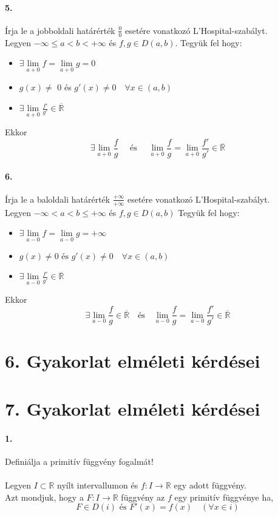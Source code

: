 \documentclass[10pt,a4paper]{article}
\newcommand{\R}{\mathbb{R}}
\newcommand{\pf}{+\infty}
\newcommand{\nf}{-\infty}
\renewcommand{\>}{\rightarrow}
\begin{document}
\paragraph{5.}
Írja le a jobboldali határérték $\frac{0}{0}$ esetére vonatkozó L'Hospital-szabályt. \\
Legyen $\nf \leq a < b < \pf $ és $f,g\in D(a,b).$ Tegyük fel hogy:
\begin{itemize}
\item $\exists \lim\limits_{a+0}f=\lim\limits_{a+0}g=0 $
\item $g(x)\neq$ 0 és $g'(x)\neq 0 \quad \forall x \in (a,b)$
\item $\exists \lim\limits_{a+0} \frac{f'}{g'} \in \overline{\R}$
\end{itemize}
Ekkor
\[
\exists 	\lim\limits_{a+0} \frac{f}{g} \quad \text{ és } \quad \lim\limits_{a+0}\frac{f}{g} = \lim\limits_{a+0}\frac{f'}{g'} \in \overline{\R}
\]
\paragraph{6.}
Írja le a baloldali határérték $\frac{\pf}{\pf}$ esetére vonatkozó L'Hospital-szabályt. \\
Legyen $\nf < a<b\leq \pf$ és $f,g\in D(a,b)$ Tegyük fel hogy:
\begin{itemize}
\item $\exists \lim\limits_{a-0}f=\lim\limits_{a-0} g = \pf$
\item $g(x)\neq 0 \text{ és } g'(x)\neq 0 \quad \forall x \in(a,b)$
\item $\exists \lim\limits_{a-0} \frac{f'}{g'} \in \overline{\R}$
\end{itemize}
Ekkor
\[
\exists \lim\limits_{a-0}\frac{f}{g} \in \overline{\R} \quad \text{és} \quad \lim\limits_{a-0}\frac{f}{g} = \lim\limits_{a-0} \frac{f'}{g'} \in \overline{\R}
\]
\newpage
\section{6. Gyakorlat elméleti kérdései}
\newpage
\section{7. Gyakorlat elméleti kérdései}
\paragraph{1.}
Definiálja a primitív függvény fogalmát!
\\ \\
Legyen $I \subset \R$ nyílt intervallumon és $f : I \rightarrow \R$ egy adott függvény. \\ Azt mondjuk, hogy a $F : I \rightarrow \R$ függvény az $f$ egy primitív függvénye ha,
\[
F \in D(i) \text{ és } F'(x) = f(x)  \quad (\forall x \in i)
\] 
\end{document}
